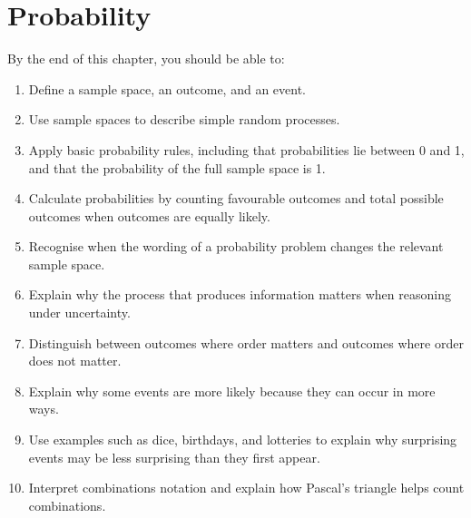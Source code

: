 \documentclass[
  letterpaper,
  DIV=11,
  numbers=noendperiod]{scrreprt}
\providecommand{\tightlist}{%
  \setlength{\itemsep}{0pt}\setlength{\parskip}{0pt}}
\begin{document}

\chapter{Probability}\label{probability}

\begin{tcolorbox}[enhanced jigsaw, arc=.35mm, bottomrule=.15mm, bottomtitle=1mm, breakable, colback=white, colbacktitle=quarto-callout-note-color!10!white, colframe=quarto-callout-note-color-frame, coltitle=black, left=2mm, leftrule=.75mm, opacityback=0, opacitybacktitle=0.6, rightrule=.15mm, title=\textcolor{quarto-callout-note-color}{\faInfo}\hspace{0.5em}{Learning Objectives}, titlerule=0mm, toprule=.15mm, toptitle=1mm]

By the end of this chapter, you should be able to:

\begin{enumerate}
\def\labelenumi{\arabic{enumi}.}
\tightlist
\item
  Define a sample space, an outcome, and an event.
\item
  Use sample spaces to describe simple random processes.
\item
  Apply basic probability rules, including that probabilities lie
  between 0 and 1, and that the probability of the full sample space is
  1.
\item
  Calculate probabilities by counting favourable outcomes and total
  possible outcomes when outcomes are equally likely.
\item
  Recognise when the wording of a probability problem changes the
  relevant sample space.
\item
  Explain why the process that produces information matters when
  reasoning under uncertainty.
\item
  Distinguish between outcomes where order matters and outcomes where
  order does not matter.
\item
  Explain why some events are more likely because they can occur in more
  ways.
\item
  Use examples such as dice, birthdays, and lotteries to explain why
  surprising events may be less surprising than they first appear.
\item
  Interpret combinations notation and explain how Pascal's triangle
  helps count combinations.
\end{enumerate}

\end{tcolorbox}
\end{document}
